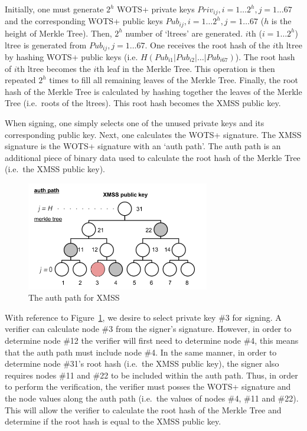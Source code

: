 \documentclass[a4paper,10pt,twocolumn]{article}
\begin{document}
	Initially, one must generate \( 2^h \) WOTS+ private keys \( Priv_{ij}, i = 1 \ldots 2^h ,  j=1 \ldots 67\) and the
	corresponding WOTS+ public keys \( Pub_{ij}, i = 1 \ldots 2^h , j=1 \ldots 67 \)  (\(h\) is the height of Merkle Tree).
	Then, \(2^h\) number of `ltrees' are generated. \(i\)th (\(i = 1 \ldots 2^h\)) ltree is generated from
	\( Pub_{ij}, j = 1 \ldots 67 \). One receives the root hash of the \(i\)th
	ltree by hashing WOTS+ public keys (i.e. \( H(Pub_{i1} |  Pub_{i2} | \ldots  |  Pub_{i67} ) \)). The root hash of \(i\)th ltree
	becomes the \(i\)th leaf in the Merkle Tree. This operation is then repeated \( 2^h \) times to fill all remaining leaves of the Merkle Tree.
	Finally, the root hash of the Merkle Tree is calculated by hashing together the leaves of the Merkle Tree (i.e.\ roots of the ltrees). This root 
	hash becomes the XMSS public key.
	
	\vspace{2.5mm}
	
	When signing, one simply selects one of the unused private keys and its corresponding public key. Next, one calculates the WOTS+ signature. The 
	XMSS signature is the WOTS+ signature with an `auth path'. The auth path is an additional piece of binary data used to calculate the 
	root hash of the Merkle Tree (i.e.\ the XMSS public key).
	
	\newpage
	
	\begin{figure}[ht]
		\begin{center}
		\includegraphics[width=80mm]{auth_path.png}
		  \caption{The auth path for XMSS}
		\label{fig:xmss_auth}
		\end{center}
	 \end{figure}
	
	\vspace{-3.5mm}
	
	With reference to Figure~\ref{fig:xmss_auth}, we desire to select private key \#3 for signing. A verifier can calculate node \#3 from the 
	signer's signature. However, in order to determine node \#12 the verifier will first need to determine node \#4, this means that the auth 
	path must include node \#4. In the same manner, in order to determine node \#31's root hash (i.e.\ the XMSS public key), the signer also 
	requires nodes \#11 and \#22 to be included within the auth path. Thus, in order to perform the verification, the verifier must posses the 
	WOTS+ signature and the node values along the auth path (i.e.\ the values of nodes \#4, \#11 and \#22). This will allow the verifier to 
	calculate the root hash of the Merkle Tree and determine if the root hash is equal to the XMSS public key.
	
\end{document}
